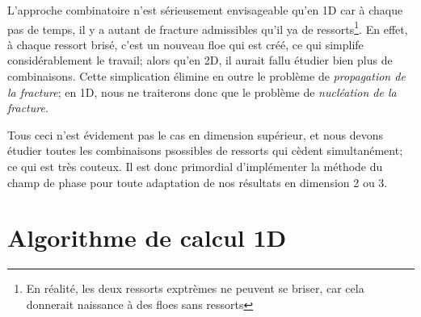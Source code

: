 L'approche combinatoire n'est sérieusement envisageable qu'en 1D car à chaque pas de temps, il y a autant de fracture admissibles qu'il ya de ressorts\footnote{En réalité, les deux ressorts exptrèmes ne peuvent se briser, car cela donnerait naissance à des floes sans ressorts}. En effet, à chaque ressort brisé, c'est un nouveau floe qui est créé, ce qui simplife considérablement le travail; alors qu'en 2D, il aurait fallu étudier bien plus de combinaisons. Cette simplication élimine en outre le problème de \emph{propagation de la fracture}; en 1D, nous ne traiterons donc que le problème de \emph{nucléation de la fracture}. 

Tous ceci n'est évidement pas le cas en dimension supérieur, et nous devons étudier toutes les combinaisons psossibles de ressorts qui cèdent simultanément; ce qui est très couteux. Il est donc primordial d'implémenter la méthode du champ de phase pour toute adaptation de nos résultats en dimension 2 ou 3.







\section{Algorithme de calcul 1D}


